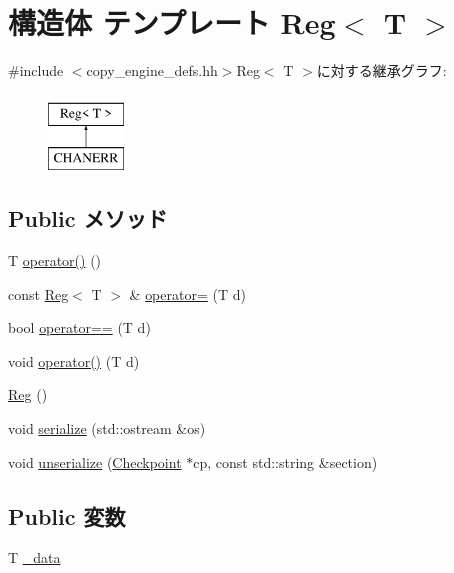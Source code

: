 \hypertarget{structCopyEngineReg_1_1Reg}{
\section{構造体 テンプレート Reg$<$ T $>$}
\label{structCopyEngineReg_1_1Reg}
}


{\ttfamily \#include $<$copy\_\-engine\_\-defs.hh$>$}Reg$<$ T $>$に対する継承グラフ:\begin{figure}[H]
\begin{center}
\leavevmode
\includegraphics[height=2cm]{structCopyEngineReg_1_1Reg}
\end{center}
\end{figure}
\subsection*{Public メソッド}
\begin{DoxyCompactItemize}
\item 
T \hyperlink{structCopyEngineReg_1_1Reg_aaba2db6079c528211c6b095cdb08fcf6}{operator()} ()
\item 
const \hyperlink{structCopyEngineReg_1_1Reg}{Reg}$<$ T $>$ \& \hyperlink{structCopyEngineReg_1_1Reg_ae79c18c14f560a6d39b4111ac120b702}{operator=} (T d)
\item 
bool \hyperlink{structCopyEngineReg_1_1Reg_a784db2d8753913b11cdf46eae9c2e6a5}{operator==} (T d)
\item 
void \hyperlink{structCopyEngineReg_1_1Reg_ad75a4d427f25956add1791f7b59fe1cb}{operator()} (T d)
\item 
\hyperlink{structCopyEngineReg_1_1Reg_a93961d9c207640497631d54c51526721}{Reg} ()
\item 
void \hyperlink{structCopyEngineReg_1_1Reg_a53e036786d17361be4c7320d39c99b84}{serialize} (std::ostream \&os)
\item 
void \hyperlink{structCopyEngineReg_1_1Reg_af22e5d6d660b97db37003ac61ac4ee49}{unserialize} (\hyperlink{classCheckpoint}{Checkpoint} $\ast$cp, const std::string \&section)
\end{DoxyCompactItemize}
\subsection*{Public 変数}
\begin{DoxyCompactItemize}
\item 
T \hyperlink{structCopyEngineReg_1_1Reg_a57c5c9d30605c3947f4972fb48761bee}{\_\-data}
\end{DoxyCompactItemize}

